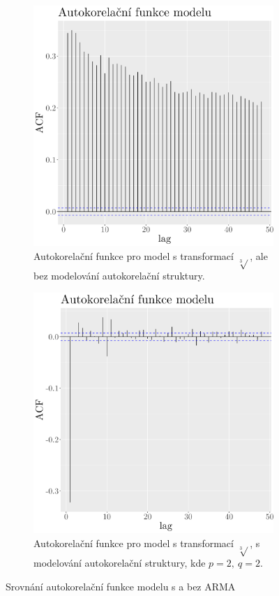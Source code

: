 \begin{figure}
	\centering
	\begin{subfigure}{0.45\textwidth}
  \includegraphics[width=\textwidth]{img/ch2/acf_curt.png}
		\caption{Autokorelační funkce pro model s transformací $\sqrt[3]{}$, ale bez modelování autokorelační struktury.}
		\label{fig:acf_curtnoARMA}
	\end{subfigure}
	\hfill
	\begin{subfigure}{0.45\textwidth}
  \includegraphics[width=\textwidth]{img/ch2/acf_curtARMA22.png}
		\caption{Autokorelační funkce pro model s transformací $\sqrt[3]{}$, s modelování autokorelační struktury, kde $p=2,\ q=2$.}
		\label{fig:acf_curtARMA22}
	\end{subfigure}
	\caption{Srovnání autokorelační funkce modelu s a bez ARMA}
	\label{fig:acf_curt}
\end{figure}

